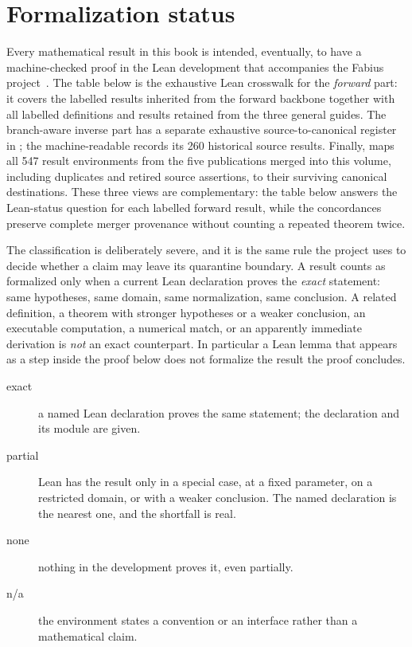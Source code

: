 \documentclass[11pt,a4paper,oneside,openany]{book}
\theoremstyle{definition}
\theoremstyle{remark}
\newcommand{\statusexact}{\textsf{\color{statusgreen}exact}}
\newcommand{\statuspartial}{\textsf{\color{statusamber}partial}}
\newcommand{\statusnone}{\textsf{\color{statusred}none}}
\newcommand{\statusna}{\textsf{n/a}}
\begin{document}
\chapter{Formalization status}\label{app:lean-status}

Every mathematical result in this book is intended, eventually, to have a
machine-checked proof in the Lean development that accompanies the Fabius
project~\cite{ReshetnikovProveIt2026}.  The table below is the exhaustive Lean
crosswalk for the \emph{forward} part: it covers the labelled results inherited
from the forward backbone together with all labelled definitions and results
retained from the three general guides.  The branch-aware inverse part has a
separate exhaustive source-to-canonical register in
; the machine-readable
 records its 260 historical source results.
Finally,  maps all 547 result environments from
the five publications merged into this volume, including duplicates and
retired source assertions, to their surviving canonical destinations.  These
three views are complementary: the table below answers the Lean-status
question for each labelled forward result, while the concordances preserve
complete merger provenance without counting a repeated theorem twice.

The classification is deliberately severe, and it is the same rule the
project uses to decide whether a claim may leave its quarantine boundary.
A result counts as formalized only when a current Lean declaration proves
the \emph{exact} statement: same hypotheses, same domain, same
normalization, same conclusion.  A related definition, a theorem with
stronger hypotheses or a weaker conclusion, an executable computation, a
numerical match, or an apparently immediate derivation is \emph{not} an
exact counterpart.  In particular a Lean lemma that appears as a step
inside the proof below does not formalize the result the proof concludes.

\begin{description}
\item[\statusexact] a named Lean declaration proves the same statement; the
  declaration and its module are given.
\item[\statuspartial] Lean has the result only in a special case, at a fixed
  parameter, on a restricted domain, or with a weaker conclusion.  The named
  declaration is the nearest one, and the shortfall is real.
\item[\statusnone] nothing in the development proves it, even partially.
\item[\statusna] the environment states a convention or an interface rather
  than a mathematical claim.
\end{description}
\end{document}

